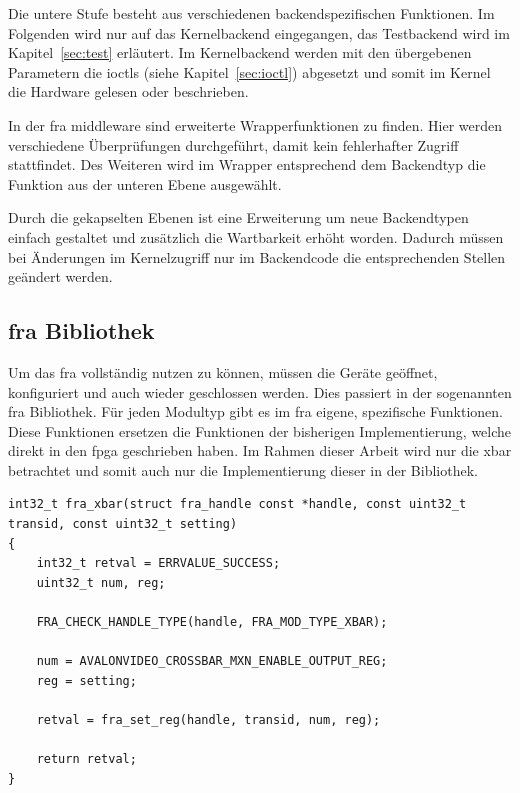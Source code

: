 Die untere Stufe besteht aus verschiedenen backendspezifischen Funktionen. Im Folgenden wird nur auf das Kernelbackend eingegangen, das Testbackend wird im Kapitel~\ref{sec:test} erläutert. Im Kernelbackend werden mit den übergebenen Parametern die \ac{ioctl}s (siehe Kapitel~\ref{sec:ioctl}) abgesetzt und somit im Kernel die Hardware gelesen oder beschrieben.

In der \ac{fra} \gls{middleware} sind erweiterte Wrapperfunktionen zu finden. Hier werden verschiedene Überprüfungen durchgeführt, damit kein fehlerhafter Zugriff stattfindet. Des Weiteren wird im Wrapper entsprechend dem Backendtyp die Funktion aus der unteren Ebene ausgewählt. 


Durch die gekapselten Ebenen ist eine Erweiterung um neue Backendtypen einfach gestaltet und zusätzlich die Wartbarkeit erhöht worden. 
Dadurch müssen bei Änderungen im Kernelzugriff nur im Backendcode die entsprechenden Stellen geändert werden.\\

\subsection{\acs{fra} Bibliothek}
Um das \ac{fra} vollständig nutzen zu können, müssen die Geräte geöffnet, konfiguriert und auch wieder geschlossen werden. Dies passiert in der sogenannten \ac{fra} Bibliothek. 
Für jeden Modultyp gibt es im \ac{fra} eigene, spezifische Funktionen. Diese Funktionen ersetzen die Funktionen der bisherigen Implementierung, welche direkt in den \ac{fpga} geschrieben haben. Im Rahmen dieser Arbeit wird nur die \ac{xbar} betrachtet und somit auch nur die Implementierung dieser in der Bibliothek.

\begin{lstfloat}
\begin{lstlisting}
int32_t fra_xbar(struct fra_handle const *handle, const uint32_t transid, const uint32_t setting)
{
	int32_t retval = ERRVALUE_SUCCESS;
	uint32_t num, reg;
	
	FRA_CHECK_HANDLE_TYPE(handle, FRA_MOD_TYPE_XBAR);
	
	num = AVALONVIDEO_CROSSBAR_MXN_ENABLE_OUTPUT_REG;
	reg = setting;
	
	retval = fra_set_reg(handle, transid, num, reg);  
	
	return retval;
}
\end{lstlisting}
\end{lstfloat}

